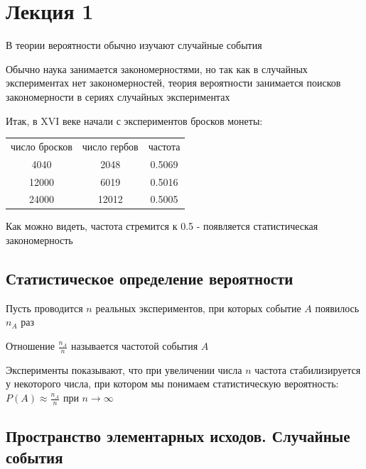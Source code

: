 \documentclass[12pt]{article}
\begin{document}
    \tableofcontents
    \clearpage


    \section{Лекция 1}

    В теории вероятности обычно изучают случайные события

    Обычно наука занимается закономерностями, но так как в случайных экспериментах нет закономерностей, теория
    вероятности занимается поисков закономерности в сериях случайных экспериментах

    Итак, в XVI веке начали с экспериментов бросков монеты:

    \begin{tabular}{ccc}
        число бросков & число гербов & частота \\
        4040 & 2048 & 0.5069 \\
        12000 & 6019 & 0.5016 \\
        24000 & 12012 & 0.5005 \\
    \end{tabular}

    Как можно видеть, частота стремится к 0.5 - появляется статистическая закономерность

    \hypertarget{statisticaldefinitionofprobability}{}

    \subsection{Статистическое определение вероятности}

    Пусть проводится $n$ реальных экспериментов, при которых событие $A$ появилось $n_A$ раз

    Отношение $\frac{n_A}{n}$ называется частотой события $A$

    Эксперименты показывают, что при увеличении числа $n$ частота стабилизируется у некоторого числа,
    при котором мы понимаем статистическую вероятность: $P(A) \approx \frac{n_A}{n}$ при $n \to \infty$

    \subsection{Пространство элементарных исходов. Случайные события}

    \hypertarget{spaceofelementaryoutcomes}{}
\end{document}
